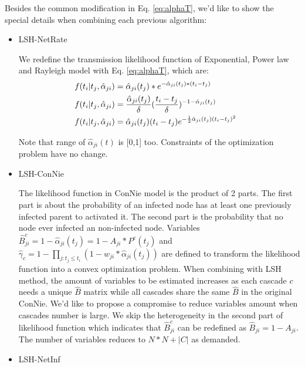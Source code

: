 Besides the common modification in Eq. \ref{eq:alphaT}, we'd like to show the special details when combining each previous algorithm:
\begin{itemize}
\item LSH-NetRate

\quad We redefine the transmission likelihood function of Exponential, Power law and Rayleigh model with Eq. \ref{eq:alphaT}, which are:
\begin{eqnarray}
\centering
&f(t_i|t_j,\hat{\alpha}_{ji})=\hat{\alpha}_{ji}(t_j)*e^{-\hat{\alpha}_{ji}(t_j)*(t_i-t_j)}& \nonumber \\
&f(t_i|t_j,\hat{\alpha}_{ji})=\frac{\hat{\alpha}_{ji}(t_j)}{\delta}(\frac{t_i-t_j}{\delta})^{-1-\hat{\alpha}_{ji}(t_j)}&\nonumber \\
&f(t_i|t_j,\hat{\alpha}_{ji})=\hat{\alpha}_{ji}(t_j)(t_i-t_j)e^{-\frac{1}{2} \hat{\alpha}_{ji}(t_j) (t_i-t_j)^2}& \nonumber
\end{eqnarray}

Note that range of $\hat{\alpha}_{ji}(t)$ is [0,1] too. Constraints of the optimization problem have no change.
\item LSH-ConNie

\quad The likelihood function in ConNie model is the product of 2 parts. The first part is about the probability of an infected node has at least one previously infected parent to activated it. The second part is the probability that no node ever infected an non-infected node. Variables $\hat{B}_{ji}^c=1-\hat{\alpha}_{ji}(t_j)=1-A_{ji}*P^c(t_j)$ and $\hat{\gamma}_c=1-\prod_{j:t_j \leq t_i}(1-w_{ji}\ast \hat{\alpha}_{ji}(t_j))$ are defined to transform the likelihood function into a convex optimization problem. When combining with LSH method, the amount of variables to be estimated increases as each cascade $c$ needs a unique $\hat{B}$ matrix while all cascades share the same $\hat{B}$ in the original ConNie. We'd like to propose a compromise to reduce variables amount when cascades number is large. We skip the heterogeneity in the second part of likelihood function which indicates that $\hat{B}_{ji}^c$ can be redefined as $\hat{B}_{ji}=1-A_{ji}$. The number of variables reduces to $N*N+|C|$ as demanded.
\item LSH-NetInf


\end{itemize}
